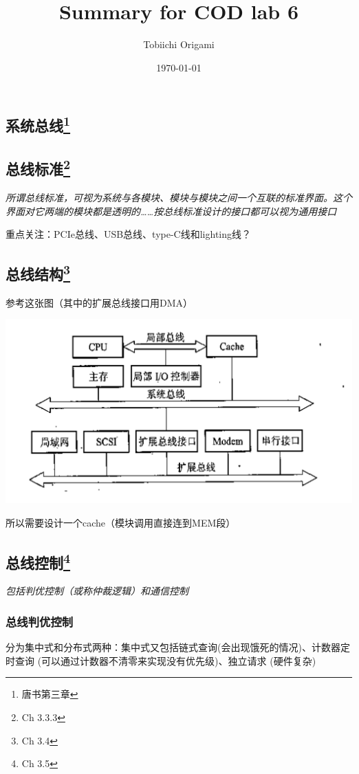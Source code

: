 \documentclass[]{report}
\title{Summary for COD lab 6}
\author{Tobiichi Origami}
\date{\today}
\begin{document}
	\maketitle


	\begin{center}
		\chapter[]{系统总线\footnote{唐书第三章}}
	\end{center}
		\section[]{总线标准\footnote{Ch 3.3.3}}\par
			\emph{所谓总线标准，可视为系统与各模块、模块与模块之间一个互联的标准界面。这个界面对它两端的模块都是透明的……按总线标准设计的接口都可以视为通用接口}\par
			重点关注：PCIe总线、USB总线、type-C线和lighting线？
		\section[]{总线结构\footnote{Ch 3.4}}\par
			参考这张图（其中的扩展总线接口用DMA）\par
			\includegraphics[scale = 0.25]{../pictures/Triple_Bus.png}\par
			所以需要设计一个cache（模块调用直接连到MEM段）
		\section[]{总线控制\footnote{Ch 3.5}}\par
			\emph{包括判优控制（或称仲裁逻辑）和通信控制}
			\subsection{总线判优控制}\par
				分为集中式和分布式两种：集中式又包括链式查询(会出现饿死的情况)、计数器定时查询 (可以通过计数器不清零来实现没有优先级)、独立请求 (硬件复杂)
\end{document}
